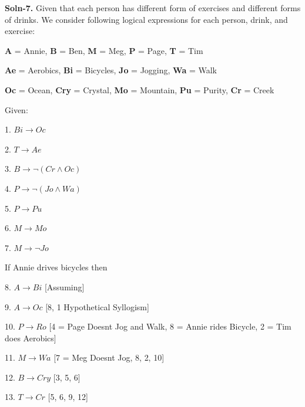 \documentclass{article}
\begin{document}
\begin{enumerate}
        \textbf{Soln-7.} Given that each person has different form of exercises 
                        and different forms of drinks. We consider following logical 
                        expressions for each person, drink, and exercise: \par

                        \textbf{A} = Annie, \textbf{B} = Ben, \textbf{M} = Meg, \textbf{P} = Page, \textbf{T} = Tim \par
                        \textbf{Ae} = Aerobics, \textbf{Bi} = Bicycles, \textbf{Jo} = Jogging, \textbf{Wa} = Walk \par
                        \textbf{Oc} = Ocean, \textbf{Cry} = Crystal, \textbf{Mo} = Mountain, \textbf{Pu} = Purity, \textbf{Cr} = Creek \par

                        Given: \par
                        1. $Bi \rightarrow Oc$ \par
                        2. $T \rightarrow Ae$ \par
                        3. $B \rightarrow \neg (Cr \wedge Oc)$ \par
                        4. $P \rightarrow \neg (Jo \wedge Wa)$ \par
                        5. $P \rightarrow Pu$ \par
                        6. $M \rightarrow Mo$ \par
                        7. $M \rightarrow \neg Jo$ \par
                        If Annie drives bicycles then \par
                        8.  $A \rightarrow Bi$	[Assuming] \par
                        9.  $A \rightarrow Oc$	[8, 1 Hypothetical Syllogism] \par
                        10. $P \rightarrow Ro$	[4 = Page Doesnt Jog and Walk, 8 = Annie rides Bicycle, 2 = Tim does Aerobics] \par
                        11. $M \rightarrow Wa$	[7 = Meg Doesnt Jog, 8, 2, 10] \par
                        12. $B \rightarrow Cry$	[3, 5, 6] \par
                        13. $T \rightarrow Cr$	[5, 6, 9, 12] \par


\end{enumerate}
\end{document}
